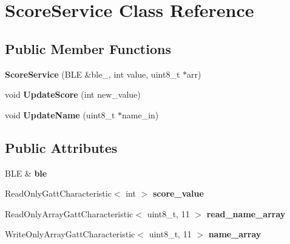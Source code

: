 \hypertarget{class_score_service}{}\section{Score\+Service Class Reference}
\label{class_score_service}
\subsection*{Public Member Functions}
\begin{DoxyCompactItemize}
\item 
\hypertarget{class_score_service_a80d66c33f58b27ae273ef9a320aa03b0}{}\label{class_score_service_a80d66c33f58b27ae273ef9a320aa03b0} 
{\bfseries Score\+Service} (B\+LE \&ble\+\_\+, int value, uint8\+\_\+t $\ast$arr)
\item 
\hypertarget{class_score_service_a811699e48dfd89b0142127bc3fdbefd8}{}\label{class_score_service_a811699e48dfd89b0142127bc3fdbefd8} 
void {\bfseries Update\+Score} (int new\+\_\+value)
\item 
\hypertarget{class_score_service_aa93be0bd20fd9e3c0b36d698aee36fb7}{}\label{class_score_service_aa93be0bd20fd9e3c0b36d698aee36fb7} 
void {\bfseries Update\+Name} (uint8\+\_\+t $\ast$name\+\_\+in)
\end{DoxyCompactItemize}
\subsection*{Public Attributes}
\begin{DoxyCompactItemize}
\item 
\hypertarget{class_score_service_a1cf28a118440191845e68e6ea404dd02}{}\label{class_score_service_a1cf28a118440191845e68e6ea404dd02} 
B\+LE \& {\bfseries ble}
\item 
\hypertarget{class_score_service_a83d84cb53769713080b5825b1867f77d}{}\label{class_score_service_a83d84cb53769713080b5825b1867f77d} 
Read\+Only\+Gatt\+Characteristic$<$ int $>$ {\bfseries score\+\_\+value}
\item 
\hypertarget{class_score_service_a2e917a4a827a4edc36ef4795170fdb01}{}\label{class_score_service_a2e917a4a827a4edc36ef4795170fdb01} 
Read\+Only\+Array\+Gatt\+Characteristic$<$ uint8\+\_\+t, 11 $>$ {\bfseries read\+\_\+name\+\_\+array}
\item 
\hypertarget{class_score_service_a600bc6e2b6061233044885f47a429d84}{}\label{class_score_service_a600bc6e2b6061233044885f47a429d84} 
Write\+Only\+Array\+Gatt\+Characteristic$<$ uint8\+\_\+t, 11 $>$ {\bfseries name\+\_\+array}
\end{DoxyCompactItemize}
